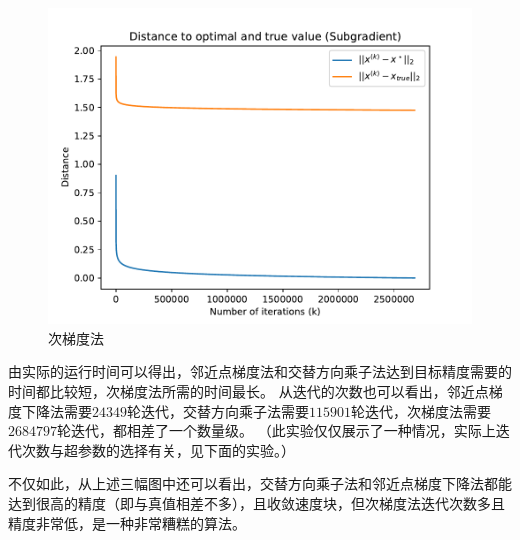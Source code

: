 \documentclass[logo,reportComp]{thesis}
\begin{document}
\begin{figure}[H]
\centering
\includegraphics[width=0.5\linewidth]{fig/subgrad.pdf}
\caption{次梯度法}
\label{fig:subgrad}
\end{figure}

由实际的运行时间可以得出，邻近点梯度法和交替方向乘子法达到目标精度需要的时间都比较短，次梯度法所需的时间最长。
从迭代的次数也可以看出，邻近点梯度下降法需要$24349$轮迭代，交替方向乘子法需要$115901$轮迭代，次梯度法需要$2684797$轮迭代，都相差了一个数量级。
（此实验仅仅展示了一种情况，实际上迭代次数与超参数的选择有关，见下面的实验。）

不仅如此，从上述三幅图中还可以看出，交替方向乘子法和邻近点梯度下降法都能达到很高的精度（即与真值相差不多），且收敛速度块，但次梯度法迭代次数多且精度非常低，是一种非常糟糕的算法。
\end{document}

